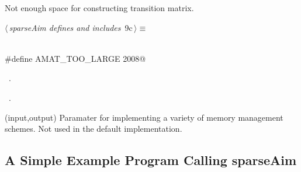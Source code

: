 \documentclass{article}
\begin{document}
\begin{description}
\begin{description}
\begin{flushleft}
\begin{minipage}{\linewidth}
\begin{list}{}{\setlength{\itemsep}{-\parsep}\setlength{\itemindent}{-\leftmargin}}
\item{}
\end{list}
\end{minipage}\vspace{4ex}
\end{flushleft}
\item[{\bf AMAT\_TOO\_LARGE}] Not enough space for constructing transition matrix.
\begin{flushleft} \small
\begin{minipage}{\linewidth}\label{scrap11}\raggedright\small
{} $\langle\,${\itshape sparseAim defines and includes}\nobreak\ {\footnotesize {9c}}$\,\rangle\equiv$
\vspace{-1ex}
\begin{list}{}{} \item
\mbox{}\verb@@\\
\mbox{}\verb@#define AMAT_TOO_LARGE 2008@\\
\mbox{}\verb@@{\NWsep}
\end{list}
\vspace{-1.5ex}
\footnotesize
\begin{list}{}{\setlength{\itemsep}{-\parsep}\setlength{\itemindent}{-\leftmargin}}
\item \NWtxtMacroDefBy\ .
\item \NWtxtMacroRefIn\ .

\item{}
\end{list}
\end{minipage}\vspace{4ex}
\end{flushleft}
\end{description}
\item[{\bf aPointerToVoid}] (input,output)  Paramater for implementing a variety
of memory management schemes. Not used in the default implementation.
\end{description}

\subsection{A Simple Example Program Calling sparseAim}
\end{document}
